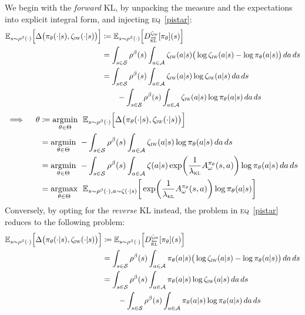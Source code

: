 We begin with the \emph{forward} KL, by unpacking the measure and the expectations into explicit integral form,
and injecting \textsc{eq}~\ref{pistar}:
\begin{align}
  \mathbb{E}_{s \sim \rho^\beta(\cdot)}
  \Big[
  \Delta\big(\pi_\theta(\cdot | s), \zeta_\textsc{iw}(\cdot | s)\big)
  \Big]
  &\coloneqq
  \mathbb{E}_{s \sim \rho^\beta(\cdot)}
  \Big[
  D^{\zeta_\textsc{iw}}_{\overrightarrow{\textsc{kl}}}[\pi_\theta](s)
  \Big]
  \\
  &= \int_{s \in \mathcal{S}} \rho^\beta(s) \int_{a \in \mathcal{A}} \zeta_\textsc{iw}(a | s)
  \big(\log \zeta_\textsc{iw}(a | s) - \log \pi_\theta(a | s)\big) \, da \, ds
  \\
  &= \int_{s \in \mathcal{S}} \rho^\beta(s) \int_{a \in \mathcal{A}} \zeta_\textsc{iw}(a | s)
  \log \zeta_\textsc{iw}(a | s) \, da \, ds \nonumber \\
  & \qquad -
  \int_{s \in \mathcal{S}} \rho^\beta(s) \int_{a \in \mathcal{A}} \zeta_\textsc{iw}(a | s)
  \log \pi_\theta(a | s) \, da \, ds
\end{align}
\begin{align}
  \implies \quad
  \theta &\coloneqq
  \operatorname*{\arg\!\min}_{\theta \in \Theta} \;\,
  \mathbb{E}_{s \sim \rho^\beta(\cdot)}
  \Big[
  \Delta\big(\pi_\theta(\cdot | s), \zeta_\textsc{iw}(\cdot | s)\big)
  \Big]
  \\
  &= \operatorname*{\arg\!\min}_{\theta \in \Theta} \;\,
  - \int_{s \in \mathcal{S}} \rho^\beta(s) \int_{a \in \mathcal{A}}
  \zeta_\textsc{iw}(a | s)
  \log \pi_\theta(a | s) \, da \, ds \\
  &= \operatorname*{\arg\!\min}_{\theta \in \Theta} \;\,
  - \int_{s \in \mathcal{S}} \rho^\beta(s) \int_{a \in \mathcal{A}}
  \zeta(a | s) \exp (\frac{1}{\lambda_\textsc{kl}} A^{\pi_\theta}_\omega(s,a))
  \log \pi_\theta(a | s) \, da \, ds \\
  &= \operatorname*{\arg\!\max}_{\theta \in \Theta} \;\,
  \mathbb{E}_{s \sim \rho^\beta(\cdot), a \sim \zeta(\cdot | s)}
  \bigg[
  \exp (\frac{1}{\lambda_\textsc{kl}} A^{\pi_\theta}_\omega(s,a)) \log \pi_\theta(a | s)
  \bigg]
\end{align}
Conversely, by opting for the \emph{reverse} KL instead, the problem in \textsc{eq}~\ref{pistar}
reduces to the following problem:
\begin{align}
  \mathbb{E}_{s \sim \rho^\beta(\cdot)}
  \Big[
  \Delta\big(\pi_\theta(\cdot | s), \zeta_\textsc{iw}(\cdot | s)\big)
  \Big]
  &\coloneqq
  \mathbb{E}_{s \sim \rho^\beta(\cdot)}
  \Big[
  D^{\zeta_\textsc{iw}}_{\overleftarrow{\textsc{kl}}}[\pi_\theta](s)
  \Big]
  \\
  &= \int_{s \in \mathcal{S}} \rho^\beta(s) \int_{a \in \mathcal{A}} \pi_\theta(a | s)
  \big(\log \zeta_\textsc{iw}(a | s) - \log \pi_\theta(a | s)\big) \, da \, ds
  \\
  &= \int_{s \in \mathcal{S}} \rho^\beta(s) \int_{a \in \mathcal{A}} \pi_\theta(a | s)
  \log \zeta_\textsc{iw}(a | s) \, da \, ds \nonumber \\
  & \qquad -
  \int_{s \in \mathcal{S}} \rho^\beta(s) \int_{a \in \mathcal{A}} \pi_\theta(a | s)
  \log \pi_\theta(a | s) \, da \, ds
\end{align}
